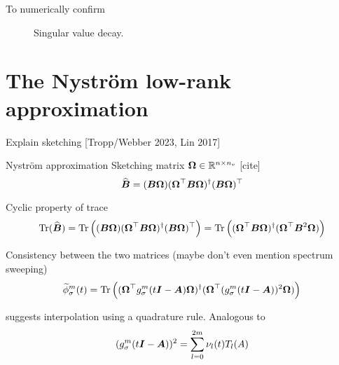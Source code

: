 To numerically confirm 

\begin{figure}[ht]
    \centering
    \caption{Singular value decay. }
    \label{fig:3-nystrom-singular-value-decay}
\end{figure}


\section{The Nystr\"om low-rank approximation}
\label{sec:3-nystrom-nystrom}

Explain sketching [Tropp/Webber 2023, Lin 2017]

Nyström approximation \cite{gittens2013nystrom}
Sketching matrix $\boldsymbol{\Omega} \in \mathbb{R}^{n \times n_v}$ [cite]
\begin{equation}
    \widehat{\boldsymbol{B}} = (\boldsymbol{B} \boldsymbol{\Omega}) (\boldsymbol{\Omega}^{\top} \boldsymbol{B} \boldsymbol{\Omega})^{\dagger} (\boldsymbol{B} \boldsymbol{\Omega})^{\top}
    \label{equ:3-nystrom-SS-nystrom}
\end{equation}

Cyclic property of trace
\begin{equation}
    \operatorname{Tr}(\widehat{\boldsymbol{B}})
        = \operatorname{Tr}\left((\boldsymbol{B} \boldsymbol{\Omega}) (\boldsymbol{\Omega}^{\top} \boldsymbol{B} \boldsymbol{\Omega})^{\dagger} (\boldsymbol{B} \boldsymbol{\Omega})^{\top} \right)
        = \operatorname{Tr}\left((\boldsymbol{\Omega}^{\top} \boldsymbol{B} \boldsymbol{\Omega})^{\dagger} (\boldsymbol{\Omega}^{\top} \boldsymbol{B}^2 \boldsymbol{\Omega}) \right)
    \label{equ:3-nystrom-nystrom-trace}
\end{equation}

Consistency between the two matrices (maybe don't even mention spectrum sweeping)
\begin{equation}
    \widetilde{\phi}_{\sigma}^m(t)
        = \operatorname{Tr}\left((\boldsymbol{\Omega}^{\top} g_{\sigma}^m(t\boldsymbol{I} - \boldsymbol{A}) \boldsymbol{\Omega})^{\dagger} (\boldsymbol{\Omega}^{\top} (g_{\sigma}^m(t\boldsymbol{I} - \boldsymbol{A}))^2 \boldsymbol{\Omega})\right)
    \label{equ:3-nystrom-spectral-density}
\end{equation}

\cite{lin2017randomized} suggests interpolation using a quadrature rule.
Analogous to 
\begin{equation}
    (g_{\sigma}^m(t\boldsymbol{I} - \boldsymbol{A}))^2 = \sum_{l=0}^{2m} \nu_l(t) T_l(A)
    \label{equ:3-nystrom-ESS-chebyshev-expansion}
\end{equation}

